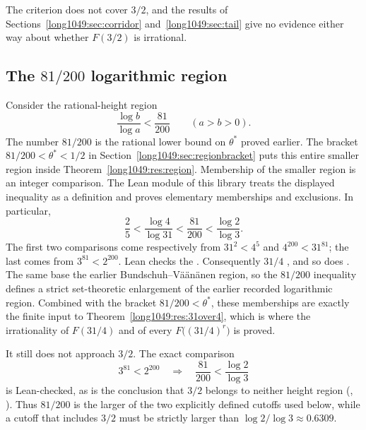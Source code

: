 The criterion does not cover $3/2$, and the results of
Sections~\ref{long1049:sec:corridor} and~\ref{long1049:sec:tail} give no evidence either way
about whether $F(3/2)$ is irrational.

\subsection{The \texorpdfstring{$81/200$}{81/200} logarithmic region}

Consider the rational-height region
\[
 \frac{\log b}{\log a}<\frac{81}{200}
 \qquad(a>b>0).
\]
The number $81/200$ is the rational lower bound on $\theta^*$
proved earlier. The bracket
$81/200<\theta^{*}<1/2$ in Section~\ref{long1049:sec:regionbracket}
puts this entire smaller region inside
Theorem~\ref{long1049:res:region}. Membership of the smaller region is
an integer comparison.  The Lean module of
this library treats the displayed inequality as a definition and proves
elementary memberships and exclusions.  In particular,
\[
 \frac25
 <\frac{\log4}{\log31}
 <\frac{81}{200}
 <\frac{\log2}{\log3}.
\]
The first two comparisons come respectively from $31^2<4^5$ and
$4^{200}<31^{81}$; the last comes from $3^{81}<2^{200}$.  Lean checks the
.  Consequently $31/4$
,
and so does
.
The same base
the earlier Bundschuh--V\"a\"an\"anen region, so the $81/200$ inequality defines a strict set-theoretic enlargement of the
earlier recorded logarithmic region.  Combined with the bracket
$81/200<\theta^{*}$, these memberships are exactly the finite input to
Theorem~\ref{long1049:res:31over4}, which is where the irrationality of $F(31/4)$ and of
every $F\bigl((31/4)^{r}\bigr)$ is proved.

It still does not approach $3/2$.  The exact comparison
\[
 3^{81}<2^{200}
 \quad\Longrightarrow\quad
 \frac{81}{200}<\frac{\log2}{\log3}
\]
is Lean-checked, as is the conclusion that $3/2$ belongs to neither height
region
(,
).
Thus $81/200$ is the larger of the two explicitly defined cutoffs used below,
while a cutoff that includes $3/2$ must be strictly larger than
$\log2/\log3\approx0.6309$.

